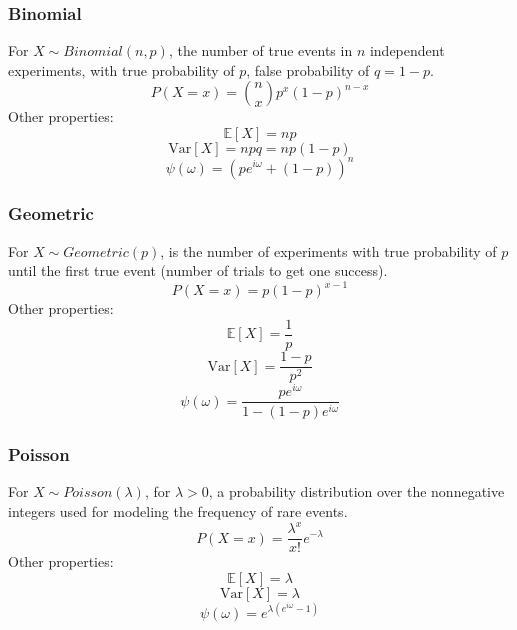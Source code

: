 \documentclass[twoside,twocolumn]{article}
\begin{document}
\subsubsection{Binomial}
For $X\sim Binomial(n, p)$, the number of true events in $n$ independent
experiments, with true probability of $p$, false probability of $q=1-p$.
\begin{equation}
  \displaystyle P(X=x)=\displaystyle\binom{n}{x} p^x(1-p)^{n-x}
\end{equation}
Other properties:
\begin{equation}
  \mathbb { E }[X] = np
\end{equation}
\begin{equation}
  \mbox{Var}[X] = npq = np(1-p)
\end{equation}
\begin{equation}
  \psi(\omega) = (pe^{i\omega}+(1-p))^n
\end{equation}
\subsubsection{Geometric}
For $X\sim Geometric(p)$, is the number of experiments with true
probability of $p$ until the first true event (number of trials to get one success).
\begin{equation}
  \displaystyle P(X=x)=p(1-p)^{x-1}
\end{equation}
Other properties:
\begin{equation}
  \mathbb { E }[X] = \frac{1}{p}
\end{equation}
\begin{equation}
  \mbox{Var}[X] = \frac{1-p}{p^2}
\end{equation}
\begin{equation}
  \psi(\omega) = \frac{pe^{i \omega}}{1-(1-p)e^{i \omega}}
\end{equation}
\subsubsection{Poisson}
For $X\sim Poisson(\lambda)$, for $\lambda > 0$, a probability distribution
over the nonnegative integers
used for modeling the frequency of rare events.
\begin{equation}
  \displaystyle P(X=x)=\frac{\lambda^x}{x!}e^{-\lambda}
\end{equation}
Other properties:
\begin{equation}
  \mathbb { E }[X] = \lambda
\end{equation}
\begin{equation}
  \mbox{Var}[X] = \lambda
\end{equation}
\begin{equation}
  \psi(\omega) = e^{\lambda(e^{i\omega}-1)}
\end{equation}
\end{document}

